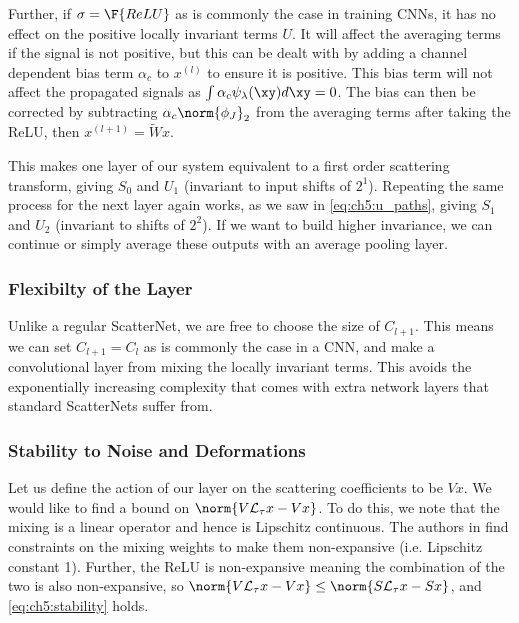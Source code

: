 Further, if $\sigma = \F{ReLU}$ as is commonly the case in training CNNs, it has
no effect on the positive locally invariant terms $U$. It will affect the averaging terms
if the signal is not positive, but this can be dealt with by adding a channel
dependent bias term $\alpha_c$ to $x^{(l)}$ to ensure it is positive. This bias term
will not affect the propagated signals as $\int \alpha_c \psi_\lambda(\xy) d\xy =
0$. The bias can then be corrected by subtracting $\alpha_c \norm{\phi_J}_2$ from
the averaging terms after taking the ReLU, then $x^{(l+1)} = \tilde{W}x$.

This makes one layer of our system equivalent to a first order scattering
transform, giving $S_0$ and $U_1$ (invariant to input shifts of $2^1$). Repeating the
same process for the next layer again works, as we saw in \eqref{eq:ch5:u_paths},
giving $S_1$ and $U_2$ (invariant to shifts of $2^2$).  If we want to build
higher invariance, we can continue or simply average these outputs with an average pooling
layer.

\subsubsection{Flexibilty of the Layer}
Unlike a regular ScatterNet, we are free to choose the size of $C_{l+1}$. This
means we can set $C_{l+1} = C_{l}$ as is commonly the case in a CNN, and make a
convolutional layer from mixing the locally invariant terms. This avoids the
exponentially increasing complexity that comes with extra network layers that 
standard ScatterNets suffer from.

\subsubsection{Stability to Noise and Deformations}
Let us define the action of our layer on the scattering
coefficients to be $Vx$. We would like to find a bound on $\norm{V\mathcal{L}_\tau x -
V x}$. To do this, we note that the mixing is a linear operator and hence is
Lipschitz continuous. The authors in \cite{qiu_dcfnet:_2018} find constraints on the mixing
weights to make them non-expansive (i.e. Lipschitz constant 1).
Further, the ReLU is non-expansive meaning the combination of the two is
also non-expansive, so $\norm{V\mathcal{L}_\tau x - V x} \leq \norm{S\mathcal{L}_\tau
x - Sx}$, and \eqref{eq:ch5:stability} holds.


